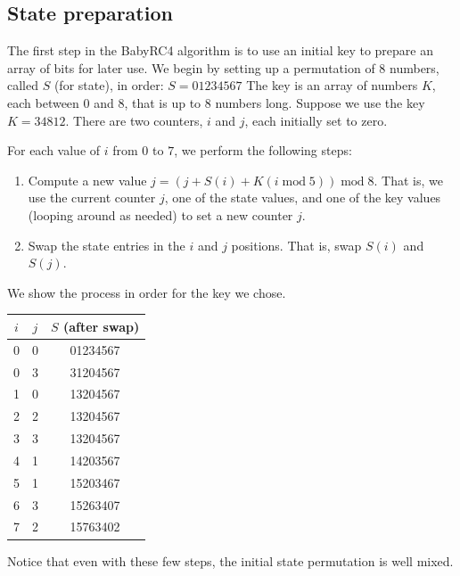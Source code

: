 \documentclass{book}
\theoremstyle{plain}
\theoremstyle{definition}
\renewcommand{\mod}{\operatorname{mod}}
\renewcommand{\mod}{\operatorname{mod}}
\begin{document}
\subsection{State preparation}
The first step in the BabyRC4 algorithm is to use an initial key to prepare an array of bits for later use. We begin by setting up a permutation of $8$ numbers, called $S$ (for state), in order: $S = 01234567$
The key is an array of numbers $K$, each between $0$ and $8$, that is up to $8$ numbers long. Suppose we use the key $K = 3 4 8 1 2$. There are two counters, $i$ and $j$, each initially set to zero.

For each value of $i$ from $0$ to $7$, we perform the following steps:
\begin{enumerate}
\item Compute a new value $j = (j + S(i) + K(i \mod 5)) \mod 8$. That is, we use the current counter $j$, one of the state values, and one of the key values (looping around as needed) to set a new counter $j$.
\item Swap the state entries in the $i$ and $j$ positions. That is, swap $S(i)$ and $S(j)$.
\end{enumerate}

We show the process in order for the key we chose.
\begin{center}
\begin{tabular}{ccc}
$i$ & $j$ & $S$ (after swap) \\
\hline
0 & 0 & 01234567 \\
0 & 3 & 31204567 \\
1 & 0 & 13204567 \\
2 & 2 & 13204567 \\
3 & 3 & 13204567 \\
4 & 1 & 14203567 \\
5 & 1 & 15203467 \\
6 & 3 & 15263407 \\
7 & 2 & 15763402
\end{tabular}
\end{center}
Notice that even with these few steps, the initial state permutation is well mixed.
\end{document}
